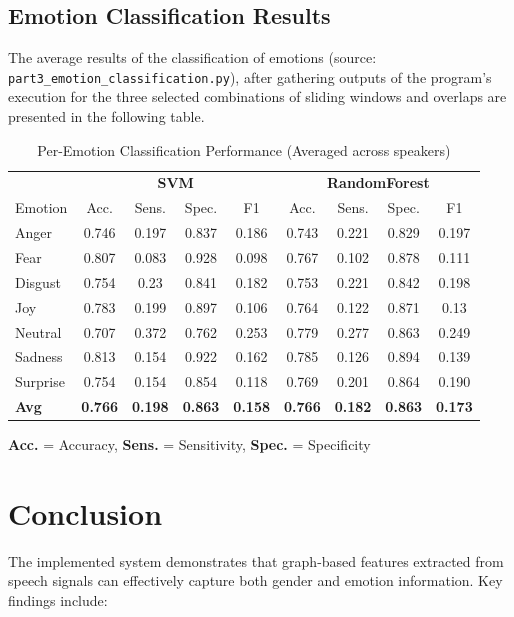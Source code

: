 \documentclass[12pt]{ieeetj}
\begin{document}
\subsection{Emotion Classification Results}

The average results of the classification of 
emotions (source: \texttt{part3\_emotion\_classification.py}),
after gathering outputs of the program's execution for the three selected combinations 
of sliding windows and overlaps are presented in the following table.


\begin{table}[h]
\centering
\caption{Per-Emotion Classification Performance (Averaged across speakers)}
\label{tab:emotion_results}
\begin{tabular}{lcccccccc}
\toprule
 & \multicolumn{4}{c}{\textbf{SVM}} & \multicolumn{4}{c}{\textbf{RandomForest}} \\
\cmidrule(lr){2-5} \cmidrule(lr){6-9}
Emotion & Acc. & Sens. & Spec. & F1 & Acc. & Sens. & Spec. & F1 \\
\midrule
Anger & 0.746 & 0.197 & 0.837 & 0.186 & 0.743 & 0.221 & 0.829 & 0.197 \\
Fear & 0.807 & 0.083 & 0.928 & 0.098 & 0.767 & 0.102 & 0.878 & 0.111 \\
Disgust & 0.754 & 0.23 & 0.841 & 0.182 & 0.753 & 0.221 & 0.842 & 0.198 \\
Joy & 0.783 & 0.199 & 0.897 & 0.106 & 0.764 & 0.122 & 0.871 & 0.13 \\
Neutral & 0.707 & 0.372 & 0.762 & 0.253 & 0.779 & 0.277 & 0.863 & 0.249 \\
Sadness & 0.813 & 0.154 & 0.922 & 0.162 & 0.785 & 0.126 & 0.894 & 0.139 \\
Surprise & 0.754 & 0.154 & 0.854 & 0.118 & 0.769 & 0.201 & 0.864 & 0.190 \\
\midrule
\textbf{Avg} & \textbf{0.766} & \textbf{0.198} & \textbf{0.863} & \textbf{0.158} & \textbf{0.766} & \textbf{0.182} & \textbf{0.863} & \textbf{0.173} \\
\bottomrule
\end{tabular}

\vspace{0.2cm}
\footnotesize
\textbf{Acc.} = Accuracy, \textbf{Sens.} = Sensitivity, \textbf{Spec.} = Specificity
\end{table}








\section{Conclusion}
The implemented system demonstrates that graph-based features extracted from speech signals can effectively capture both gender and emotion information. Key findings include:
\end{document}

